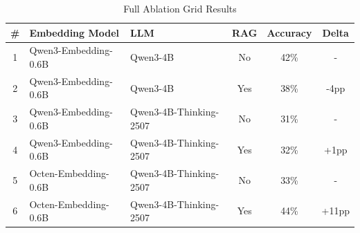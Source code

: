 \begin{table}[htbp]
\centering
\caption{Full Ablation Grid Results}
\label{tab:ablation}
\begin{tabular}{c l l c c c}
\toprule
\# & Embedding Model & LLM & RAG & Accuracy & Delta \\
\midrule
1 & Qwen3-Embedding-0.6B & Qwen3-4B & No & 42\% & - \\
2 & Qwen3-Embedding-0.6B & Qwen3-4B & Yes & 38\% & -4pp \\
3 & Qwen3-Embedding-0.6B & Qwen3-4B-Thinking-2507 & No & 31\% & - \\
4 & Qwen3-Embedding-0.6B & Qwen3-4B-Thinking-2507 & Yes & 32\% & +1pp \\
5 & Octen-Embedding-0.6B & Qwen3-4B-Thinking-2507 & No & 33\% & - \\
6 & Octen-Embedding-0.6B & Qwen3-4B-Thinking-2507 & Yes & 44\% & +11pp \\
\bottomrule
\end{tabular}
\end{table}